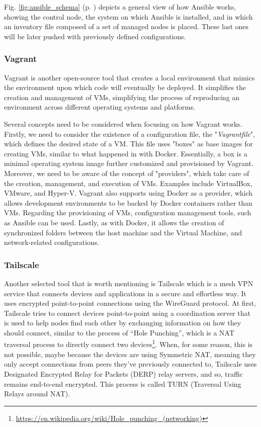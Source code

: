 Fig. \ref{fig:ansible_schema} (p. \pageref{fig:ansible_schema}) depicts a general view of how Ansible works, showing the control node, the system on which Ansible is installed, and in which an inventory file composed of a set of managed nodes is placed. These last ones will be later pushed with previously defined configurations.

\subsubsection{Vagrant} \label{sec:selected_tools_vagrant}

Vagrant is another open-source tool that creates a local environment that mimics the environment upon which code will eventually be deployed. It simplifies the creation and management of VMs, simplifying the process of reproducing an environment across different operating systems and platforms.

Several concepts need to be considered when focusing on how Vagrant works. Firstly, we need to consider the existence of a configuration file, the "\textit{Vagrantfile}", which defines the desired state of a VM. This file uses "boxes" as base images for creating VMs, similar to what happened in with Docker. Essentially, a box is a minimal operating system image further customized and provisioned by Vagrant. Moreover, we need to be aware of the concept of "providers", which take care of the creation, management, and execution of VMs. Examples include VirtualBox, VMware, and Hyper-V. Vagrant also supports using Docker as a provider, which allows development environments to be backed by Docker containers rather than VMs. Regarding the provisioning of VMs, configuration management tools, such as Ansible can be used. Lastly, as with Docker, it allows the creation of synchronized folders between the host machine and the Virtual Machine, and network-related configurations.

\subsubsection{Tailscale} \label{sec:selected_tools_tailscale}

Another selected tool that is worth mentioning is Tailscale which is a mesh VPN service that connects devices and applications in a secure and effortless way. It uses encrypted point-to-point connections using the WireGuard protocol. At first, Tailscale tries to connect devices point-to-point using a coordination server that is used to help nodes find each other by exchanging information on how they should connect, similar to the process of ``Hole Punching'', which is a NAT traversal process to directly connect two devices\footnote{\url{https://en.wikipedia.org/wiki/Hole_punching_(networking)}}. When, for some reason, this is not possible, maybe because the devices are using Symmetric NAT, meaning they only accept connections from peers they've previously connected to, Tailscale uses Designated Encrypted Relay for Packets (DERP) relay servers, and so, traffic remains end-to-end encrypted. This process is called TURN (Traversal Using Relays around NAT).

